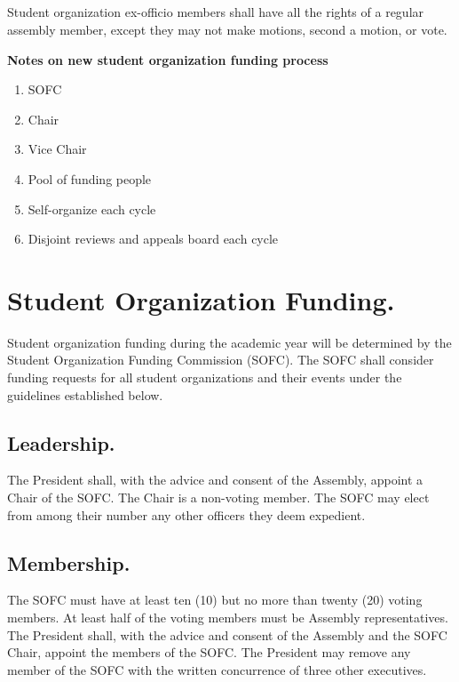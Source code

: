 \subsection{}
Student organization ex-officio members shall have all the rights of a regular assembly member, except they may not make motions, second a motion, or vote.


\begin{framed}
\textbf{Notes on new student organization funding process}
\begin{enumerate}
\item SOFC
\item Chair
\item Vice Chair
\item Pool of funding people
\item Self-organize each cycle 
\item Disjoint reviews and appeals board each cycle
\end{enumerate}
\end{framed}


\section{Student Organization Funding.}
Student organization funding during the academic year will be determined by the Student Organization Funding Commission (SOFC).  The SOFC shall consider funding requests for all student organizations and their events under the guidelines established below.

\subsection{Leadership.}
The President shall, with the advice and consent of the Assembly, appoint a Chair of the SOFC.  The Chair is a non-voting member.  The SOFC may elect from among their number any other officers they deem expedient.

\subsection{Membership.}
The SOFC must have at least ten (10) but no more than twenty (20) voting members.  At least half of the voting members must be Assembly representatives.  The President shall, with the advice and consent of the Assembly and the SOFC Chair, appoint the members of the SOFC.  The President may remove any member of the SOFC with the written concurrence of three other executives.

